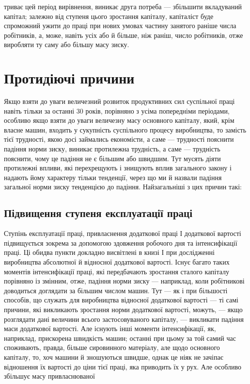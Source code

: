 \parcont{}  %
триває цей період вирівнення, виникає друга потреба — збільшити вкладуваний капітал; залежно від
ступеня цього зростання капіталу, капіталіст буде спроможний ужити до праці при нових умовах частину
занятого раніше числа робітників, а, може, навіть усіх або й більше, ніж раніш, число робітників,
отже виробляти ту саму або більшу масу зиску.

\section{Протидіючі причини}

Якщо взяти до уваги величезний розвиток продуктивних сил суспільної праці навіть тільки за останні
30 років, порівняно з усіма попередніми періодами, особливо якщо взяти до уваги величезну масу
основного капіталу, який, крім власне машин, входить у сукупність суспільного процесу виробництва,
то замість тієї трудності, якою досі займались економісти, а саме — трудності пояснити падіння норми
зиску, виникає протилежна трудність, а саме — трудність пояснити, чому це падіння не є більшим або
швидшим. Тут мусять діяти протилежні впливи, які перехрещують і знищують вплив загального закону і
надають йому характеру тільки тенденції, через що ми й назвали
падіння загальної норми зиску тенденцією до падіння. Найзагальніші з цих причин такі:

\subsection{Підвищення ступеня експлуатації праці}

Ступінь експлуатації праці, привласнення додаткової праці І додаткової вартості підвищується зокрема
за допомогою здовження робочого дня та інтенсифікації праці. Ці обидва пункти докладно висвітлені в
книзі І при дослідженні виробництва абсолютної й відносної додаткової вартості. Існує багато таких
моментів інтенсифікації праці, які передбачають зростання сталого капіталу порівняно із змінним,
отже, падіння норми зиску — наприклад, коли робітникові доводиться доглядати за більшим числом
машин. Тут — як і при більшості способів, що служать для виробництва відносної додаткової вартості —
ті самі причини, які викликають зростання норми додаткової вартості, можуть, — якщо розглядати дані
величини всього застосовуваного капіталу, — викликати падіння маси додаткової вартості. Але існують
інші моменти інтенсифікації, як, наприклад, прискорена швидкість машин; останні при цьому за той
самий час споживають, правда, більше сировинного матеріалу, але щодо основного капіталу, то, хоч
машини й зношуються швидше, однак це ніяк не зачіпає відношення їх вартості до ціни тієї праці, яка
приводить їх у рух. Але особливо збільшує масу привласнюваної
\parbreak{}  %
